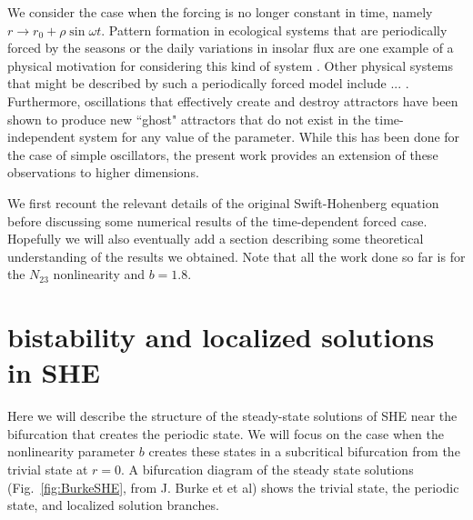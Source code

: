 \documentclass[pre,preprint,superscriptaddress]{revtex4-1}
\begin{document}
We consider the case when the forcing is no longer constant in time, namely $r\rightarrow r_0+\rho \sin\omega t$.  Pattern formation in ecological systems that are periodically forced by the seasons or the daily variations in insolar flux are one example of a physical motivation for considering this kind of system \cite{}.  Other physical systems that might be described by such a periodically forced model include ... \cite{}.   Furthermore, oscillations that effectively create and destroy attractors have been shown to produce new ``ghost" attractors that do not exist in the time-independent system for any value of the parameter\cite{}.  While this has been done for the case of simple oscillators, the present work provides an extension of these observations to higher dimensions.

We first recount the relevant details of the original Swift-Hohenberg equation before discussing some numerical results of the time-dependent forced case.  Hopefully we will also eventually add a section describing some theoretical understanding of the results we obtained.  Note that all the work done so far is for the $N_{23}$ nonlinearity and $b=1.8$.


\section{bistability and localized solutions in SHE}
Here we will describe the structure of the steady-state solutions of SHE near the bifurcation that creates the periodic state.  We will focus on the case when the nonlinearity parameter $b$ creates these states in a subcritical bifurcation from the trivial state at $r=0$.  A bifurcation diagram of the steady state solutions (Fig.~\ref{fig:BurkeSHE}, from J. Burke et et al) shows the trivial state, the periodic state, and localized solution branches.  
\end{document}
